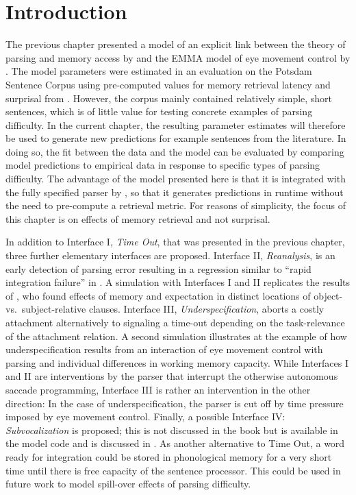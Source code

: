 \documentclass{cambridge7A}\usepackage[]{graphicx}\usepackage[]{color}
\begin{document}
\section{Introduction}



The previous chapter presented a model of an explicit link between the theory of parsing and memory access by \cite{LewisVasishth2005} and the EMMA model of eye movement control by \cite{Salvucci2001}.
The model parameters were estimated in an evaluation on the Potsdam Sentence Corpus \citep{Kliegl2004} using pre-computed values for memory retrieval latency and surprisal from \cite{BostonHaleVasishth2011}. However, the corpus mainly contained relatively simple, short sentences, which is of little value for testing concrete examples of parsing difficulty. In the current chapter, the resulting parameter estimates will therefore be used to generate new predictions for example sentences from the literature. In doing so, the fit between the data and the model can be evaluated by comparing model predictions to empirical data in response to specific types of parsing difficulty. 
The advantage of the model presented here is that it is integrated with the fully specified parser by \cite{LewisVasishth2005}, so that it generates predictions in runtime without the need to pre-compute a retrieval metric. For reasons of simplicity, the focus of this chapter is on effects of memory retrieval and not surprisal.

In addition to Interface I, \emph{Time Out}, that was presented in the previous chapter, three further elementary interfaces are proposed. Interface II,  \emph{Reanalysis}, is an early detection of parsing error resulting in a regression similar to ``rapid integration failure'' in \cite{ReichleWarrenMcConnell2009}.
A simulation with Interfaces I and II replicates the results of \cite{Staub2010a}, who found effects of memory and expectation in distinct locations of object- vs.\ subject-relative clauses. 
Interface III,  \emph{Underspecification}, aborts a costly attachment alternatively to signaling a time-out depending on the task-relevance of the attachment relation.
A second simulation illustrates at the example of \cite{MalsburgVasishth2013} how underspecification results from an interaction of eye movement control with parsing and individual differences in working memory capacity.
While Interfaces I and II are interventions by the parser that interrupt the otherwise autonomous saccade programming, Interface III is rather an intervention in the other direction: In the case of underspecification, the parser is cut off by time pressure imposed by eye movement control.
Finally, a possible Interface IV:  \emph{Subvocalization} is proposed; this is not discussed in the book but is available in the model code and is discussed in \cite{engelmann:phd}. As another alternative to Time Out, a word ready for integration could be stored in phonological memory \citep{BaddeleyHitch1974,Baddeley2003} for a very short time until there is free capacity of the sentence processor. This could be used in future work to model spill-over effects of parsing difficulty.
\end{document}

